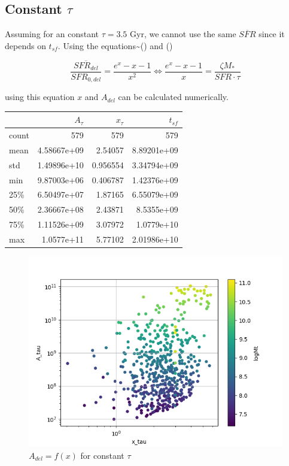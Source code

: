 \documentclass[a4paper,twocolumn]{article}
\begin{document}
\pagebreak
\subsection{Constant \(\tau\)}
\label{sec:org59966a2}


Assuming for an constant \(\tau=3.5\) Gyr, we cannot use the same \(\overline{SFR}\) since it depends on \(t_{sf}\). Using the equations\textasciitilde{}() and ()

$$
    \frac{\overline{SFR_{del}}}{SFR_{0,del}}=\frac{e^x-x-1}{x^2}\Leftrightarrow \frac{e^x-x-1}{x}=\frac{\zeta M_*}{SFR\cdot\tau}
$$

using this equation \(x\) and \(A_{del}\) can be calculated numerically.


\begin{center}
\begin{tabular}{lrrr}
 & \(A_\tau\) & \(x_\tau\) & \(t_{sf}\)\\[0pt]
\hline
count & 579 & 579 & 579\\[0pt]
mean & 4.58667e+09 & 2.54057 & 8.89201e+09\\[0pt]
std & 1.49896e+10 & 0.956554 & 3.34794e+09\\[0pt]
min & 9.87003e+06 & 0.406787 & 1.42376e+09\\[0pt]
25\% & 6.50497e+07 & 1.87165 & 6.55079e+09\\[0pt]
50\% & 2.36667e+08 & 2.43871 & 8.5355e+09\\[0pt]
75\% & 1.11526e+09 & 3.07972 & 1.0779e+10\\[0pt]
max & 1.0577e+11 & 5.77102 & 2.01986e+10\\[0pt]
\end{tabular}
\end{center}

\begin{figure}[!htpb]
\centering
\includegraphics[width=.9\linewidth]{./figs/x-A_tau.png}
\caption{\label{fig:$A_{del} = f(x)$ for constant $\tau$}\(A_{del} = f(x)\) for constant \(\tau\)}
\end{figure}
\end{document}
